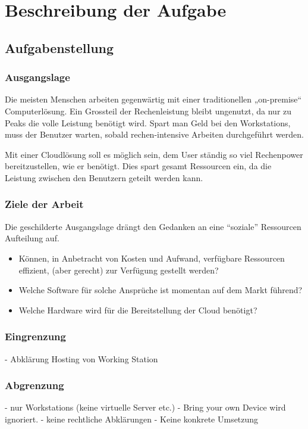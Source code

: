 \chapter{Beschreibung der Aufgabe}

\section{Aufgabenstellung}


\subsection{Ausgangslage}
Die meisten Menschen arbeiten gegenwärtig mit einer traditionellen „on-premise“ Computerlösung.
Ein Grossteil der Rechenleistung bleibt ungenutzt, da nur zu Peaks die volle Leistung benötigt wird.
Spart man Geld bei den Workstations, muss der Benutzer warten, sobald rechen-intensive Arbeiten durchgeführt werden. 

Mit einer Cloudlösung soll es möglich sein, dem User ständig so viel Rechenpower bereitzustellen, wie er benötigt.
Dies spart gesamt Ressourcen ein, da die Leistung zwischen den Benutzern geteilt werden kann.

\subsection{Ziele der Arbeit}
Die geschilderte Ausgangslage drängt den Gedanken an eine “soziale” Ressourcen Aufteilung auf.

\begin{itemize}
	\item Können, in Anbetracht von Kosten und Aufwand, verfügbare Ressourcen effizient, (aber gerecht) zur Verfügung gestellt werden?
	\item Welche Software für solche Ansprüche ist momentan auf dem Markt führend?
	\item Welche Hardware wird für die Bereitstellung der Cloud benötigt?
\end{itemize}


\subsection{Eingrenzung}
- Abklärung Hosting von Working Station

\subsection{Abgrenzung}
- nur Workstations (keine virtuelle Server etc.)  
- Bring your own Device wird ignoriert.  
- keine rechtliche Abklärungen  
- Keine konkrete Umsetzung  
